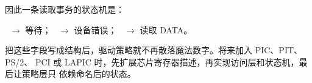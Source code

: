 因此一条读取事务的状态机是：

\begin{center}
\ $\rightarrow$ 等待；\quad
{}\ $\rightarrow$ 设备错误；\quad
{}\ $\rightarrow$ 读取 DATA。
\end{center}

把这些字段写成结构后，驱动策略就不再散落魔法数字。将来加入 PIC、PIT、PS/2、
PCI 或 LAPIC 时，先扩展芯片寄存器描述，再实现访问层和状态机，最后让策略层只
依赖命名后的状态。
